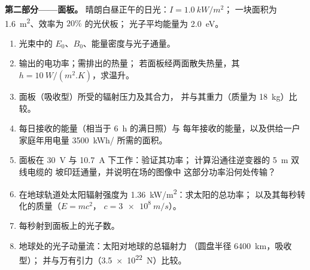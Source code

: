 \begin{problem}
\medskip
\noindent\textbf{第二部分——面板。}
晴朗白昼正午的日光：$I = \qty{1.0}{kW/m^2}$；
一块面积为 \qty{1.6}{m^2}、效率为 $20\%$ 的光伏板；
光子平均能量为 \qty{2.0}{eV}。
\begin{enumerate}[resume]
  \item 光束中的 $E_0$、$B_0$、能量密度与光子通量。
  \item 输出的电功率；需排出的热量；
        若面板经两面散失热量，其 $h = \qty{10}{W/(m^2.K)}$，求温升。
  \item 面板（吸收型）所受的辐射压力及其合力，
        并与其重力（质量为 \qty{18}{kg}）比较。
  \item 每日接收的能量（相当于 \qty{6}{h} 的满日照）与
        每年接收的能量，以及供给一户家庭年用电量
        \qty{3500}{kWh/} 所需的面积。
  \item 面板在 \qty{30}{V} 与 \qty{10.7}{A} 下工作：验证其功率；
        计算沿通往逆变器的 \qty{5}{m} 双线电缆的
        坡印廷通量，并说明在场的图像中
        这部分功率沿何处传输？
  \item 在地球轨道处太阳辐射强度为 \qty{1.36}{kW/m^2}：求太阳的总功率；
        以及其每秒转化的质量（$E = mc^2$，
        $c = \qty{3e8}{m/s}$）。
  \item 每秒射到面板上的光子数。
  \item 地球处的光子动量流：太阳对地球的总辐射力
        （圆盘半径 \qty{6400}{km}，吸收型）；
        并与万有引力（\qty{3.5e22}{N}）比较。
\end{enumerate}


\end{problem}
